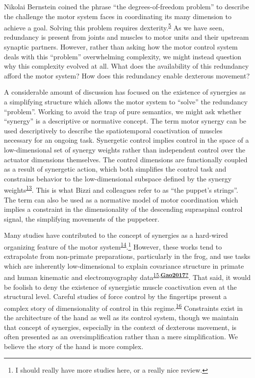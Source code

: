 \documentclass[
  a4paper,
]{article}
\begin{document}
Nikolai Bernstein coined the phrase ``the degrees-of-freedom problem''
to describe the challenge the motor system faces in coordinating its
many dimension to achieve a goal. Solving this problem requires
dexterity.\textsuperscript{\protect\hyperlink{ref-Bernstein1967}{5}} As
we have seen, redundancy is present from joints and muscles to motor
units and their upstream synaptic partners. However, rather than asking
how the motor control system deals with this ``problem'' overwhelming
complexity, we might instead question why this complexity evolved at
all. What does the availability of this redundancy afford the motor
system? How does this redundancy enable dexterous movement?

A considerable amount of discussion has focused on the existence of
synergies as a simplifying structure which allows the motor system to
``solve'' the redundancy ``problem''. Working to avoid the trap of pure
semantics, we might ask whether ``synergy'' is a descriptive or
normative concept. The term motor synergy can be used descriptively to
describe the spatiotemporal coactivation of muscles necessary for an
ongoing task. Synergetic control implies control in the space of a
low-dimensional set of synergy weights rather than independent control
over the actuator dimensions themselves. The control dimensions are
functionally coupled as a result of synergetic action, which both
simplifies the control task and constrains behavior to the
low-dimensional subspace defined by the synergy
weights\textsuperscript{\protect\hyperlink{ref-merelHierarchicalMotorControl2019}{13}}.
This is what Bizzi and colleagues refer to as ``the puppet's strings''.
The term can also be used as a normative model of motor coordination
which implies a constraint in the dimensionality of the descending
supraspinal control signal, the simplifying movements of the puppeteer.

Many studies have contributed to the concept of synergies as a
hard-wired organizing feature of the motor
system\textsuperscript{\protect\hyperlink{ref-DAvella2003}{14}}.\footnote{I
  should really have more studies here, or a really nice review.}
However, these works tend to extrapolate from non-primate preparations,
particularly in the frog, and use tasks which are inherently
low-dimensional to explain covariance structure in primate and human
kinematic and electromyography
data\textsuperscript{\protect\hyperlink{ref-giszterMotorPrimitivesNew2015}{15},\protect\hyperlink{ref-Gao2017}{\textbf{Gao2017?}}}.
That said, it would be foolish to deny the existence of synergistic
muscle coactivation even at the structural level. Careful studies of
force control by the fingertips present a complex story of
dimensionality of control in this
regime.\textsuperscript{\protect\hyperlink{ref-raczSpatiotemporalAnalysisReveals2013}{16}}
Constraints exist in the architecture of the hand as well as its control
system, though we maintain that concept of synergies, especially in the
context of dexterous movement, is often presented as an
oversimplification rather than a mere simplification. We believe the
story of the hand is more complex.
\end{document}
